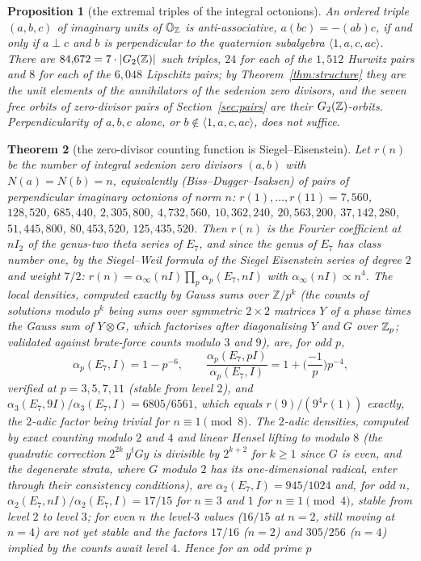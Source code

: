 \documentclass[11pt]{amsart}
\newtheorem{theorem}{Theorem}[section]
\newtheorem{proposition}[theorem]{Proposition}
\theoremstyle{definition}
\begin{document}
\begin{proposition}[the extremal triples of the integral octonions]\label{prop:triples}
An ordered triple $(a,b,c)$ of imaginary units of $\mathbb O_{\mathbb{Z}}$ is anti-associative, $a(bc)=-(ab)c$, if and only if $a\perp c$ and $b$ is perpendicular to the quaternion subalgebra $\langle1,a,c,ac\rangle$. There are $84{,}672=7\cdot|G_2(\mathbb{Z})|$ such triples, $24$ for each of the $1{,}512$ Hurwitz pairs and $8$ for each of the $6{,}048$ Lipschitz pairs; by Theorem~\ref{thm:structure} they are the unit elements of the annihilators of the sedenion zero divisors, and the seven free orbits of zero-divisor pairs of Section~\ref{sec:pairs} are their $G_2(\mathbb{Z})$-orbits. Perpendicularity of $a,b,c$ alone, or $b\notin\langle1,a,c,ac\rangle$, does not suffice.
\end{proposition}
\begin{theorem}[the zero-divisor counting function is Siegel--Eisenstein]\label{thm:count}
Let $r(n)$ be the number of integral sedenion zero divisors $(a,b)$ with $N(a)=N(b)=n$, equivalently (Biss--Dugger--Isaksen) of pairs of perpendicular imaginary octonions of norm $n$: $r(1),\dots,r(11)=7{,}560$, $128{,}520$, $685{,}440$, $2{,}305{,}800$, $4{,}732{,}560$, $10{,}362{,}240$, $20{,}563{,}200$, $37{,}142{,}280$, $51{,}445{,}800$, $80{,}453{,}520$, $125{,}435{,}520$. Then $r(n)$ is the Fourier coefficient at $nI_2$ of the genus-two theta series of $E_7$, and since the genus of $E_7$ has class number one, by the Siegel--Weil formula of the Siegel Eisenstein series of degree $2$ and weight $7/2$: $r(n)=\alpha_\infty(nI)\prod_p\alpha_p(E_7,nI)$ with $\alpha_\infty(nI)\propto n^4$. The local densities, computed exactly by Gauss sums over $\mathbb Z/p^k$ (the counts of solutions modulo $p^k$ being sums over symmetric $2\times2$ matrices $Y$ of a phase times the Gauss sum of $Y\otimes G$, which factorises after diagonalising $Y$ and $G$ over $\mathbb{Z}_p$; validated against brute-force counts modulo $3$ and $9$), are, for odd $p$,
\[\alpha_p(E_7,I)=1-p^{-6},\qquad \frac{\alpha_p(E_7,pI)}{\alpha_p(E_7,I)}=1+\Big(\frac{-1}{p}\Big)p^{-4},\]
verified at $p=3,5,7,11$ (stable from level $2$), and $\alpha_3(E_7,9I)/\alpha_3(E_7,I)=6805/6561$, which equals $r(9)/(9^4r(1))$ exactly, the $2$-adic factor being trivial for $n\equiv1\pmod 8$. The $2$-adic densities, computed by exact counting modulo $2$ and $4$ and linear Hensel lifting to modulo $8$ (the quadratic correction $2^{2k}\,y^tGy$ is divisible by $2^{k+2}$ for $k\ge1$ since $G$ is even, and the degenerate strata, where $G$ modulo $2$ has its one-dimensional radical, enter through their consistency conditions), are $\alpha_2(E_7,I)=945/1024$ and, for odd $n$, $\alpha_2(E_7,nI)/\alpha_2(E_7,I)=17/15$ for $n\equiv3$ and $1$ for $n\equiv1\pmod4$, stable from level $2$ to level $3$; for even $n$ the level-$3$ values ($16/15$ at $n=2$, still moving at $n=4$) are not yet stable and the factors $17/16$ ($n=2$) and $305/256$ ($n=4$) implied by the counts await level $4$. Hence for an odd prime $p$

\end{theorem}
\end{document}
